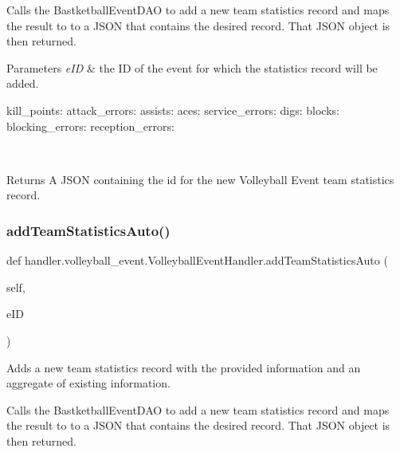 Calls the Bastketball\+Event\+D\+AO to add a new team statistics record and maps the result to to a J\+S\+ON that contains the desired record. That J\+S\+ON object is then returned.


\begin{DoxyParams}{Parameters}
{\em e\+ID} & the ID of the event for which the statistics record will be added. \begin{DoxyVerb}           kill_points:
           attack_errors:
           assists:
           aces:
           service_errors:
           digs:
           blocks:
           blocking_errors:
           reception_errors:
\end{DoxyVerb}
\\
\hline
\end{DoxyParams}
\begin{DoxyReturn}{Returns}
A J\+S\+ON containing the id for the new Volleyball Event team statistics record. 
\end{DoxyReturn}
\mbox{\label{classhandler_1_1volleyball__event_1_1_volleyball_event_handler_a2917f27fd1a43abb715b4cf94199125a}} 
\subsubsection{\texorpdfstring{add\+Team\+Statistics\+Auto()}{addTeamStatisticsAuto()}}
{\footnotesize\ttfamily def handler.\+volleyball\+\_\+event.\+Volleyball\+Event\+Handler.\+add\+Team\+Statistics\+Auto (\begin{DoxyParamCaption}\item[{}]{self,  }\item[{}]{e\+ID }\end{DoxyParamCaption})}



Adds a new team statistics record with the provided information and an aggregate of existing information. 

Calls the Bastketball\+Event\+D\+AO to add a new team statistics record and maps the result to to a J\+S\+ON that contains the desired record. That J\+S\+ON object is then returned.


